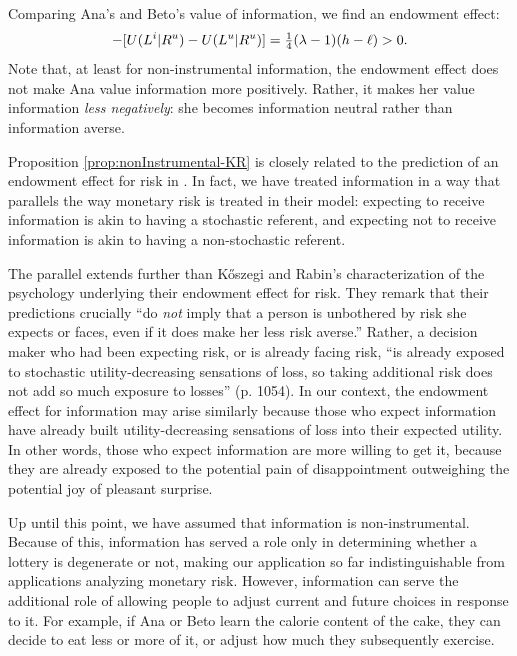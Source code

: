 Comparing Ana's and Beto's value of information, we find an endowment effect:
\begin{equation*}
  [U(L^i|R^i)-U(L^u|R^i)]-[U(L^i|R^u)-U(L^u|R^u)]=\qrtr(\lambda-1)(h-\ell)>0.
\end{equation*}
Note that, at least for non-instrumental information, the endowment effect does not make Ana value information more positively. Rather, it makes her value information \emph{less negatively}: she becomes information neutral rather than information averse.

Proposition \ref{prop:nonInstrumental-KR} is closely related to the prediction of an endowment effect for risk in \citet{koszegiReferenceDependentRiskAttitudes2007}. In fact, we have treated information in a way that parallels the way monetary risk is treated in their model: expecting to receive information is akin to having a stochastic referent, and expecting not to receive information is akin to having a non-stochastic referent.

The parallel extends further than Kőszegi and Rabin’s characterization of the psychology underlying their endowment effect for risk. They remark that their predictions crucially \enquote{do \emph{not} imply that a person is unbothered by risk she expects or faces, even if it does make her less risk averse.} Rather, a decision maker who had been expecting risk, or is already facing risk, \enquote{is already exposed to stochastic utility-decreasing sensations of loss, so taking additional risk does not add so much exposure to losses} (p. 1054). In our context, the endowment effect for information may arise similarly because those who expect information have already built utility-decreasing sensations of loss into their expected utility. In other words, those who expect information are more willing to get it, because they are already exposed to the potential pain of disappointment outweighing the potential joy of pleasant surprise.

\FloatBarrier

Up until this point, we have assumed that information is non-instrumental. Because of this, information has served a role only in determining whether a lottery is degenerate or not, making our application so far indistinguishable from applications analyzing monetary risk. However, information can serve the additional role of allowing people to adjust current and future choices in response to it. For example, if Ana or Beto learn the calorie content of the cake, they can decide to eat less or more of  it, or adjust how much they subsequently exercise.

